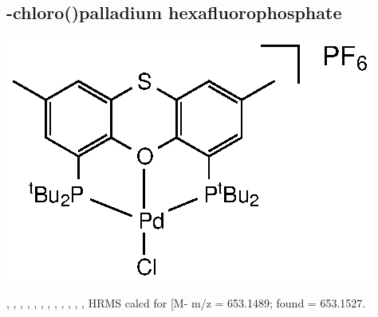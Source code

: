 \subsection*{\trans-chloro(\tBuThixantphos)palladium hexafluorophosphate}
\begin{structure}[h]
\begin{center}
\includegraphics{../Structures/StBuPdClPF6.eps}
\end{center}
\end{structure}


,
,
,
,
,
,
,
,
,
,
,
,
HRMS calcd for  [M-\ce{PF6]+} m/z = 653.1489; found = 653.1527.


